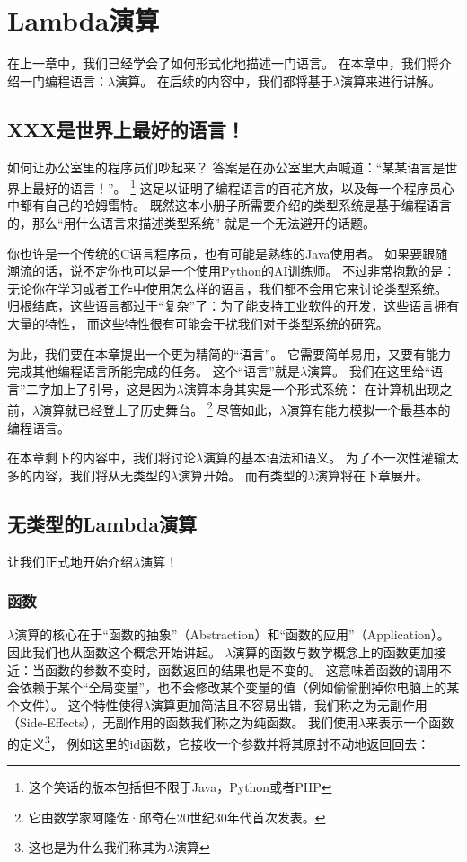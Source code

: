 \documentclass[../main.tex]{subfiles}
\begin{document}
  \section{Lambda演算}
  \indent 在上一章中，我们已经学会了如何形式化地描述一门语言。
  在本章中，我们将介绍一门编程语言：$\lambda$演算。
  在后续的内容中，我们都将基于$\lambda$演算来进行讲解。

  \subsection{XXX是世界上最好的语言！}
    \indent 如何让办公室里的程序员们吵起来？
    答案是在办公室里大声喊道：“某某语言是世界上最好的语言！”。
    \footnote[1]{这个笑话的版本包括但不限于Java，Python或者PHP}
    这足以证明了编程语言的百花齐放，以及每一个程序员心中都有自己的哈姆雷特。
    既然这本小册子所需要介绍的类型系统是基于编程语言的，那么“用什么语言来描述类型系统”
    就是一个无法避开的话题。

    \indent 你也许是一个传统的C语言程序员，也有可能是熟练的Java使用者。
    如果要跟随潮流的话，说不定你也可以是一个使用Python的AI训练师。
    不过非常抱歉的是：无论你在学习或者工作中使用怎么样的语言，我们都不会用它来讨论类型系统。
    归根结底，这些语言都过于“复杂”了：为了能支持工业软件的开发，这些语言拥有大量的特性，
    而这些特性很有可能会干扰我们对于类型系统的研究。

    \indent 为此，我们要在本章提出一个更为精简的“语言”。
    它需要简单易用，又要有能力完成其他编程语言所能完成的任务。
    这个“语言”就是$\lambda$演算。
    我们在这里给“语言”二字加上了引号，这是因为$\lambda$演算本身其实是一个形式系统：
    在计算机出现之前，$\lambda$演算就已经登上了历史舞台。
    \footnote[2]{它由数学家阿隆佐·邱奇在20世纪30年代首次发表。\cite{lamwiki}}
    尽管如此，$\lambda$演算有能力模拟一个最基本的编程语言。\cite{lamwiki}
    
    \indent 在本章剩下的内容中，我们将讨论$\lambda$演算的基本语法和语义。
    为了不一次性灌输太多的内容，我们将从无类型的$\lambda$演算开始。
    而有类型的$\lambda$演算将在下章展开。

  \subsection{无类型的Lambda演算}
    \indent 让我们正式地开始介绍$\lambda$演算！

    \subsubsection*{函数}
      \indent $\lambda$演算的核心在于“函数的抽象”（Abstraction）和“函数的应用”（Application）。
      因此我们也从函数这个概念开始讲起。
      $\lambda$演算的函数与数学概念上的函数更加接近：当函数的参数不变时，函数返回的结果也是不变的。
      这意味着函数的调用不会依赖于某个“全局变量”，也不会修改某个变量的值（例如偷偷删掉你电脑上的某个文件）。
      这个特性使得$\lambda$演算更加简洁且不容易出错，我们称之为无副作用（Side-Effects），无副作用的函数我们称之为纯函数\cite{dzwiki}。
      我们使用$\lambda$来表示一个函数的定义\footnote[1]{这也是为什么我们称其为$\lambda$演算}，
      例如这里的id函数，它接收一个参数并将其原封不动地返回回去：
\end{document}
